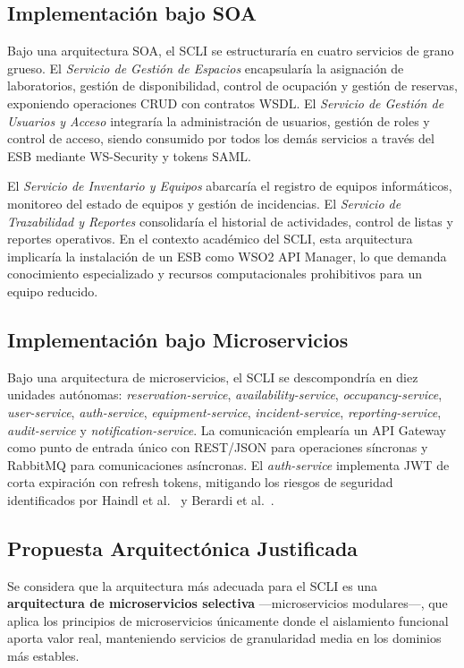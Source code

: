 \documentclass[10pt,twocolumn,letterpaper]{article}
\begin{document}
\subsection{Implementación bajo SOA}

Bajo una arquitectura SOA, el SCLI se estructuraría en cuatro servicios de grano grueso. El \textit{Servicio de Gestión de Espacios} encapsularía la asignación de laboratorios, gestión de disponibilidad, control de ocupación y gestión de reservas, exponiendo operaciones CRUD con contratos WSDL. El \textit{Servicio de Gestión de Usuarios y Acceso} integraría la administración de usuarios, gestión de roles y control de acceso, siendo consumido por todos los demás servicios a través del ESB mediante WS-Security y tokens SAML.

El \textit{Servicio de Inventario y Equipos} abarcaría el registro de equipos informáticos, monitoreo del estado de equipos y gestión de incidencias. El \textit{Servicio de Trazabilidad y Reportes} consolidaría el historial de actividades, control de listas y reportes operativos. En el contexto académico del SCLI, esta arquitectura implicaría la instalación de un ESB como WSO2 API Manager, lo que demanda conocimiento especializado y recursos computacionales prohibitivos para un equipo reducido.

\subsection{Implementación bajo Microservicios}

Bajo una arquitectura de microservicios, el SCLI se descompondría en diez unidades autónomas: \textit{reservation-service}, \textit{availability-service}, \textit{occupancy-service}, \textit{user-service}, \textit{auth-service}, \textit{equipment-service}, \textit{incident-service}, \textit{reporting-service}, \textit{audit-service} y \textit{notification-service}. La comunicación emplearía un API Gateway como punto de entrada único con REST/JSON para operaciones síncronas y RabbitMQ para comunicaciones asíncronas. El \textit{auth-service} implementa JWT de corta expiración con refresh tokens, mitigando los riesgos de seguridad identificados por Haindl et al.~\cite{b4} y Berardi et al.~\cite{b5}.

\subsection{Propuesta Arquitectónica Justificada}

Se considera que la arquitectura más adecuada para el SCLI es una \textbf{arquitectura de microservicios selectiva} ---microservicios modulares---, que aplica los principios de microservicios únicamente donde el aislamiento funcional aporta valor real, manteniendo servicios de granularidad media en los dominios más estables.
\end{document}
